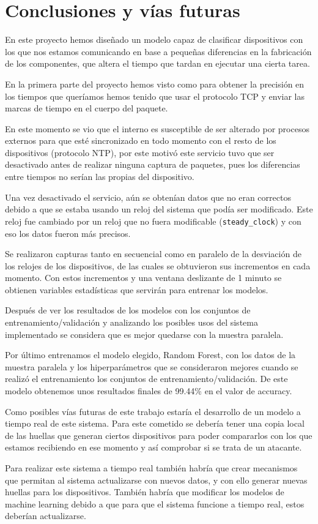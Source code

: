 
\chapter{Conclusiones y vías futuras} \label{chap:conclu}

En este proyecto hemos diseñado un modelo capaz de clasificar dispositivos con los que nos estamos comunicando en base a pequeñas diferencias en la fabricación de los componentes, que altera el tiempo que tardan en ejecutar una cierta tarea.

En la primera parte del proyecto hemos visto como para obtener la precisión en los tiempos que queríamos hemos tenido que usar el protocolo TCP y enviar las marcas de tiempo en el cuerpo del paquete. 

En este momento se vio que el interno es susceptible de ser alterado por procesos externos para que esté sincronizado en todo momento con el resto de los dispositivos (protocolo NTP), por este motivó este servicio tuvo que ser desactivado antes de realizar ninguna captura de paquetes, pues los diferencias entre tiempos no serían las propias del dispositivo.

Una vez desactivado el servicio, aún se obtenían datos que no eran correctos debido a que se estaba usando un reloj del sistema que podía ser modificado. Este reloj fue cambiado por un reloj que no fuera modificable (\texttt{steady\_clock}) y con eso los datos fueron más precisos.

Se realizaron capturas tanto en secuencial como en paralelo de la desviación de los relojes de los dispositivos, de las cuales se obtuvieron sus incrementos en cada momento. Con estos incrementos y una ventana deslizante de 1 minuto se obtienen variables estadísticas que servirán para entrenar los modelos.

Después de ver los resultados de los modelos con los conjuntos de entrenamiento/validación y analizando los posibles usos del sistema implementado se considera que es mejor quedarse con la muestra paralela. 

Por último entrenamos el modelo elegido, Random Forest, con los datos de la muestra paralela y los hiperparámetros que se consideraron mejores cuando se realizó el entrenamiento los conjuntos de entrenamiento/validación. De este modelo obtenemos unos resultados finales de 99.44\% en el valor de accuracy.

Como posibles vías futuras de este trabajo estaría el desarrollo de un modelo a tiempo real de este sistema. Para este cometido se debería tener una copia local de las huellas que generan ciertos dispositivos para poder compararlos con los que estamos recibiendo en ese momento y así comprobar si se trata de un atacante.

Para realizar este sistema a tiempo real también habría que crear mecanismos que permitan al sistema actualizarse con nuevos datos, y con ello generar nuevas huellas para los dispositivos. También habría que modificar los modelos de machine learning debido a que para que el sistema funcione a tiempo real, estos deberían actualizarse. 


